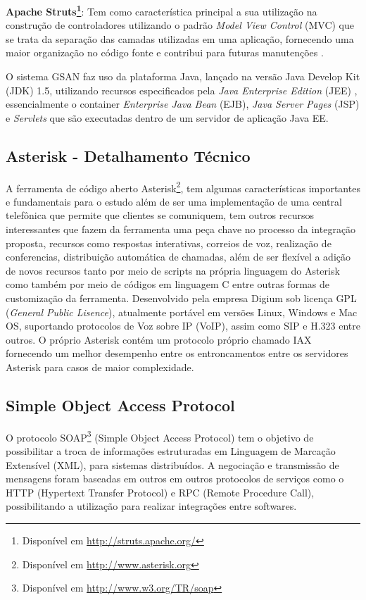 \textbf{Apache Struts\footnote{Disponível em \url{http://struts.apache.org/}}}: Tem como característica principal a sua utilização na construção de controladores utilizando o padrão \textit{Model View Control} (MVC) que se trata da separação das camadas utilizadas em uma aplicação, fornecendo uma maior organização no código fonte e contribui para futuras manutenções \cite{fowler2003}. 

O sistema GSAN faz uso da plataforma Java, lançado na versão Java Develop Kit (JDK) 1.5, utilizando recursos especificados pela \textit{Java Enterprise Edition} (JEE) \cite{PORTAL:2014}, essencialmente o container \textit{Enterprise Java Bean} (EJB), \textit{Java Server Pages }(JSP) e \textit{Servlets} que são executadas dentro de um servidor de aplicação Java EE.


\subsection{Asterisk - Detalhamento Técnico}
A ferramenta de código aberto Asterisk\footnote{Disponível em \url{http://www.asterisk.org}}, tem algumas características importantes e fundamentais para o estudo além de ser uma implementação de uma central telefônica que permite que clientes se comuniquem, tem outros recursos interessantes que fazem da ferramenta uma peça chave no processo da integração proposta, recursos como respostas interativas, correios de voz, realização de conferencias, distribuição automática de chamadas, além de ser flexível a adição de novos recursos tanto por meio de scripts na própria linguagem do Asterisk como também por meio de códigos em linguagem C entre outras formas de customização da ferramenta. Desenvolvido pela empresa Digium sob licença GPL (\textit{General Public Lisence}), atualmente portável em versões Linux, Windows e Mac OS, suportando protocolos de Voz sobre IP (VoIP), assim como SIP e H.323 entre outros. O próprio Asterisk contém um protocolo próprio chamado IAX fornecendo um melhor desempenho entre os entroncamentos entre os servidores Asterisk para casos de maior complexidade.

\subsection{Simple Object Access Protocol}
O protocolo SOAP\footnote{Disponível em  \url{http://www.w3.org/TR/soap}} (Simple Object Access Protocol) tem o objetivo de possibilitar a troca de informações estruturadas em Linguagem de Marcação Extensível (XML), para sistemas distribuídos. A negociação e transmissão de mensagens foram baseadas em outros em outros protocolos de serviços como o HTTP (Hypertext Transfer Protocol) e RPC (Remote Procedure Call), possibilitando a utilização para realizar integrações entre softwares.

